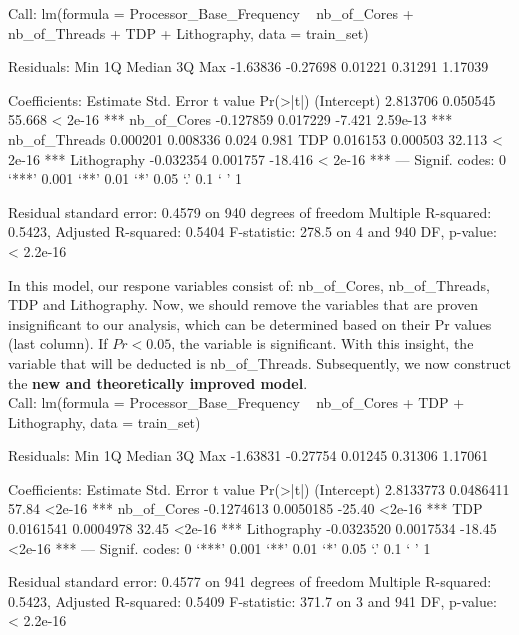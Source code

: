 Call:
lm(formula = Processor_Base_Frequency ~ nb_of_Cores + nb_of_Threads + 
    TDP + Lithography, data = train_set)

Residuals:
     Min       1Q   Median       3Q      Max 
-1.63836 -0.27698  0.01221  0.31291  1.17039 

Coefficients:
               Estimate Std. Error t value Pr(>|t|)    
(Intercept)    2.813706   0.050545  55.668  < 2e-16 ***
nb_of_Cores   -0.127859   0.017229  -7.421 2.59e-13 ***
nb_of_Threads  0.000201   0.008336   0.024    0.981    
TDP            0.016153   0.000503  32.113  < 2e-16 ***
Lithography   -0.032354   0.001757 -18.416  < 2e-16 ***
---
Signif. codes:  0 ‘***’ 0.001 ‘**’ 0.01 ‘*’ 0.05 ‘.’ 0.1 ‘ ’ 1

Residual standard error: 0.4579 on 940 degrees of freedom
Multiple R-squared:  0.5423,	Adjusted R-squared:  0.5404 
F-statistic: 278.5 on 4 and 940 DF,  p-value: < 2.2e-16


In this model, our respone variables consist of: nb\_of\_Cores, nb\_of\_Threads, TDP and Lithography. Now, we should remove the variables that are proven insignificant to our analysis, which can be determined based on their Pr values (last column). If $Pr < 0.05$, the variable is significant. With this insight, the variable that will be deducted is nb\_of\_Threads. Subsequently, we now construct the \textbf{new and theoretically improved model}. \\

Call:
lm(formula = Processor_Base_Frequency ~ nb_of_Cores + TDP + Lithography, 
    data = train_set)

Residuals:
     Min       1Q   Median       3Q      Max 
-1.63831 -0.27754  0.01245  0.31306  1.17061 

Coefficients:
              Estimate Std. Error t value Pr(>|t|)    
(Intercept)  2.8133773  0.0486411   57.84   <2e-16 ***
nb_of_Cores -0.1274613  0.0050185  -25.40   <2e-16 ***
TDP          0.0161541  0.0004978   32.45   <2e-16 ***
Lithography -0.0323520  0.0017534  -18.45   <2e-16 ***
---
Signif. codes:  0 ‘***’ 0.001 ‘**’ 0.01 ‘*’ 0.05 ‘.’ 0.1 ‘ ’ 1

Residual standard error: 0.4577 on 941 degrees of freedom
Multiple R-squared:  0.5423,	Adjusted R-squared:  0.5409 
F-statistic: 371.7 on 3 and 941 DF,  p-value: < 2.2e-16

